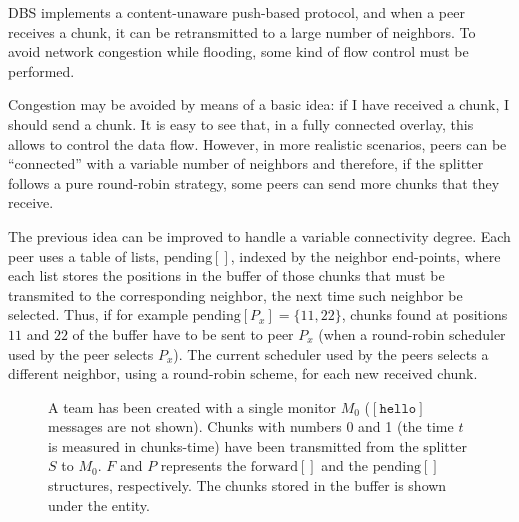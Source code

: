 
\label{sec:chunk_flooding}

\begin{comment}
\begin{figure*}
  \fig{300}{3cm}{peer_chunk_flooding}
  \caption{Chunk flooding at peers.\label{fig:peer_chunk_flooding}}
\end{figure*}
\end{comment}

DBS implements a content-unaware push-based protocol, and when a
peer receives a chunk, it can be retransmitted to a large number of
neighbors. To avoid network congestion while flooding, some kind of
flow control must be performed.


Congestion may be avoided by means of a basic idea: \textsf{if I have
  received a chunk, I should send a chunk}. It is easy to see that, in
a fully connected overlay, this allows to control the data
flow. However, in more realistic scenarios, peers can be ``connected''
with a variable number of neighbors and therefore, if the splitter
follows a pure round-robin strategy, some peers can send more chunks
that they receive.

The previous idea can be improved to handle a variable connectivity
degree. Each peer uses a table of lists, $\text{pending}[]$, indexed
by the neighbor end-points, where each list stores the positions in
the buffer of those chunks that must be transmited to the
corresponding neighbor, the next time such neighbor be selected. Thus,
if for example $\text{pending}[P_x]=\{11,22\}$, chunks found at
positions $11$ and $22$ of the buffer have to be sent to peer $P_x$
(when a round-robin scheduler used by the peer selects $P_x$). The
current scheduler used by the peers selects a different neighbor,
using a round-robin scheme, for each new received chunk.

\begin{figure}
   \caption{A team has been created with a
    single monitor $M_0$ ($[\mathtt{hello}]$ messages are not
    shown). Chunks with numbers 0 and 1 (the time $t$ is measured in
    chunks-time) have been transmitted from the splitter $S$ to
    $M_0$. $F$ and $P$ represents the $\text{forward}[]$ and the
    $\text{pending}[]$ structures, respectively. The chunks stored in
    the buffer is shown under the entity.\label{fig:team_0}}
\end{figure}

